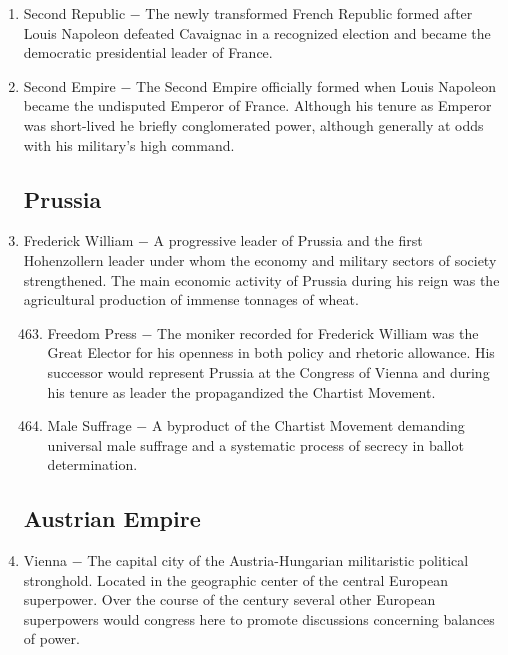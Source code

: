 \documentclass[12pt]{article}
\begin{document}
\begin{enumerate}
\item Second Republic $-$ The newly transformed French Republic formed after Louis Napoleon defeated Cavaignac in a recognized election and became the democratic presidential leader of France.

\item Second Empire $-$ The Second Empire officially formed when Louis Napoleon became the undisputed Emperor of France. Although his tenure as Emperor was short-lived he briefly conglomerated power, although generally at odds with his military's high command.

\subsection{Prussia}

\item Frederick William $-$ A progressive leader of Prussia and the first Hohenzollern leader under whom the economy and military sectors of society strengthened. The main economic activity of Prussia during his reign was the agricultural production of immense tonnages of wheat.

\begin{enumerate}[label=\arabic{*}.]
\setcounter{enumii}{462}

\item Freedom Press $-$ The moniker recorded for Frederick William was the Great Elector for his openness in both policy and rhetoric allowance. His successor would represent Prussia at the Congress of Vienna and during his tenure as leader the propagandized the Chartist Movement.

\item Male Suffrage $-$ A byproduct of the Chartist Movement demanding universal male suffrage and a systematic process of secrecy in ballot determination.

\end{enumerate}
\setcounter{enumi}{464}

\subsection{Austrian Empire}

\item Vienna $-$ The capital city of the Austria-Hungarian militaristic political stronghold. Located in the geographic center of the central European superpower. Over the course of the  century several other European superpowers would congress here to promote discussions concerning balances of power.


\end{enumerate}
\end{document}
